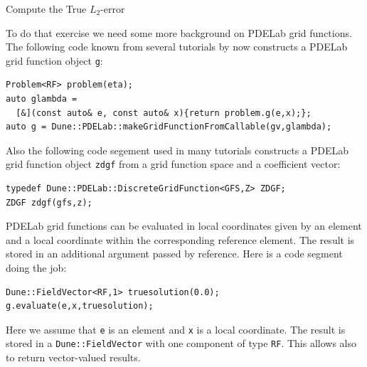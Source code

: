 \documentclass[12pt,a4paper]{article}
\begin{document}
\begin{Exercise}{Compute the True $L_2$-error}

To do that exercise we need some more background on PDELab grid functions.
The following code known from several tutorials by now
constructs a PDELab grid function object \lstinline{g}:
\begin{lstlisting}[basicstyle=\ttfamily\small,
frame=single,
backgroundcolor=\color{listingbg}]
Problem<RF> problem(eta);
auto glambda =
  [&](const auto& e, const auto& x){return problem.g(e,x);};
auto g = Dune::PDELab::makeGridFunctionFromCallable(gv,glambda);
\end{lstlisting}
Also the following code segement used in many tutorials constructs
a PDELab grid function object \lstinline{zdgf} from a grid function space and
a coefficient vector:
\begin{lstlisting}[basicstyle=\ttfamily\small,
frame=single,
backgroundcolor=\color{listingbg}]
typedef Dune::PDELab::DiscreteGridFunction<GFS,Z> ZDGF;
ZDGF zdgf(gfs,z); 
\end{lstlisting}
PDELab grid functions can be evaluated in local coordinates given by an
element and a local coordinate within the corresponding reference element.
The result is stored in an additional argument passed by reference.
Here is a code segment doing the job:
\begin{lstlisting}[basicstyle=\ttfamily\small,
frame=single,
backgroundcolor=\color{listingbg}]
Dune::FieldVector<RF,1> truesolution(0.0);
g.evaluate(e,x,truesolution);
\end{lstlisting}
Here we assume that \lstinline{e} is an element and \lstinline{x} is a local coordinate.
The result is stored in a \lstinline{Dune::FieldVector} with one component of type
\lstinline{RF}. This allows also to return vector-valued results.


\end{Exercise}
\end{document}
